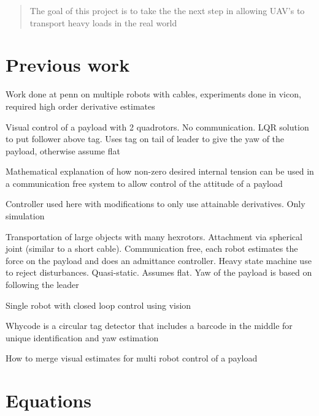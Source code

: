 \documentclass[12pt]{article}
\begin{document}
\setlength{\parindent}{0pt}

\maketitle

\begin{abstract}
The goal of this project is to take the the next step in allowing UAV's to transport heavy loads in the real world
\end{abstract}

\section{Previous work}\label{previous work}

\cite{sreenath_dynamics_2013} Work done at penn on multiple robots with cables, experiments done in vicon, required high order derivative estimates

\cite{gassner_dynamic_2017} Visual control of a payload with 2 quadrotors. No communication. LQR solution to put follower above tag. Uses tag on tail of leader to give the yaw of the payload, otherwise assume flat

\cite{tognon_aerial_2018} Mathematical explanation of how non-zero desired internal tension can be used in a communication free system to allow control of the attitude of a payload

\cite{lee_geometric_2018} Controller used here with modifications to only use attainable derivatives. Only simulation

\cite{tagliabue_robust_nodate} Transportation of large objects with many hexrotors. Attachment via spherical joint (similar to a short cable). Communication free, each robot estimates the force on the payload and does an admittance controller. Heavy state machine use to reject disturbances. Quasi-static. Assumes flat. Yaw of the payload is based on following the leader

\cite{tang_aggressive_2018} Single robot with closed loop control using vision

\cite{lightbody_efficient_2017} Whycode is a circular tag detector that includes a barcode in the middle for unique identification and yaw estimation

\cite{loianno_cooperative_2018} How to merge visual estimates for multi robot control of a payload


\section{Equations}\label{equations}
\end{document}
